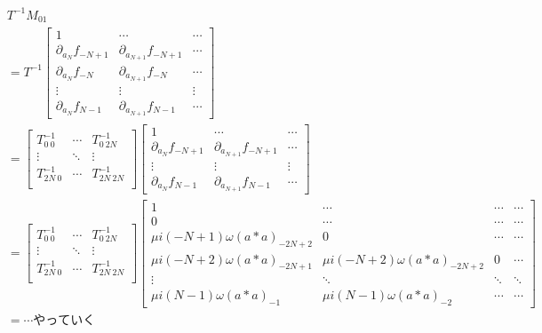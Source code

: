 \documentclass[11pt,a4paper]{jsarticle}
\theoremstyle{definition}
\begin{document}
\begin{equation}
  \begin{split}
    &T^{-1}M_{01} \\
    &= T^{-1}
    \begin{bmatrix}
      1 & \cdots & \cdots \\
      \partial_{a_N} f_{-N+1} & \partial_{a_{N+1}} f_{-N+1}  & \cdots \\
      \partial_{a_N} f_{-N} & \partial_{a_{N+1}} f_{-N}  & \cdots \\
      \vdots & \vdots & \vdots \\
      \partial_{a_N} f_{N-1} & \partial_{a_{N+1}} f_{N-1}  & \cdots
    \end{bmatrix}\\
    &= \begin{bmatrix}
      T^{-1}_{0\ 0} & \cdots & T^{-1}_{0\ 2N} \\
      \vdots & \ddots & \vdots \\
      T^{-1}_{2N\ 0} & \cdots & T^{-1}_{2N\ 2N} \\
    \end{bmatrix}
    \begin{bmatrix}
      1 & \cdots & \cdots \\
      \partial_{a_N} f_{-N+1} & \partial_{a_{N+1}} f_{-N+1}  & \cdots \\
      \vdots & \vdots & \vdots \\
      \partial_{a_N} f_{N-1} & \partial_{a_{N+1}} f_{N-1}  & \cdots
    \end{bmatrix}\\
    &= \begin{bmatrix}
      T^{-1}_{0\ 0} & \cdots & T^{-1}_{0\ 2N} \\
      \vdots & \ddots & \vdots \\
      T^{-1}_{2N\ 0} & \cdots & T^{-1}_{2N\ 2N} \\
    \end{bmatrix}
    \begin{bmatrix}
      1 & \cdots & \cdots  & \cdots\\
      0 & \cdots & \cdots  & \cdots\\
      \mu i (-N+1) \omega (a*a)_{-2N+2} & 0 & \cdots & \cdots\\
      \mu i (-N+2) \omega (a*a)_{-2N+1} & \mu i (-N+2) \omega (a*a)_{-2N+2} & 0 & \cdots \\
      \vdots & \ddots & \ddots & \ddots \\
      \mu i (N-1) \omega (a*a)_{-1} & \mu i (N-1) \omega (a*a)_{-2}  & \cdots & \cdots
    \end{bmatrix}\\
    &=\cdots やっていく
  \end{split}
\end{equation}
\end{document}
